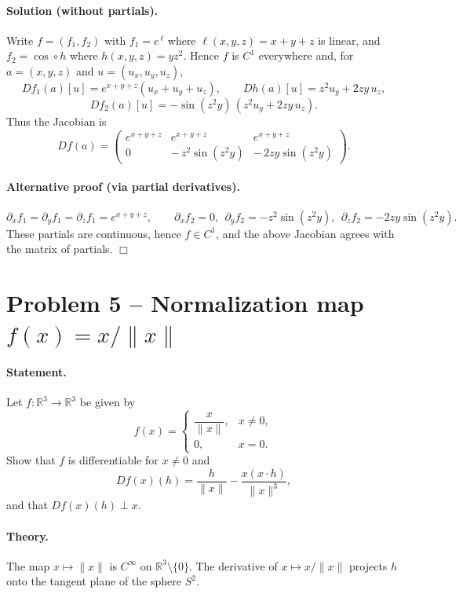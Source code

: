 \documentclass[12pt,a4paper]{article}
\theoremstyle{plain}
\theoremstyle{definition}
\theoremstyle{remark}
\theoremstyle{remark}
\begin{document}
\paragraph{Solution (without partials).}
Write $f=(f_1,f_2)$ with $f_1=e^{\,\ell}$ where $\ell(x,y,z)=x+y+z$ is linear, and
$f_2=\cos\circ h$ where $h(x,y,z)=yz^2$.
Hence $f$ is $C^1$ everywhere and, for $a=(x,y,z)$ and $u=(u_x,u_y,u_z)$,
\[
Df_1(a)[u]=e^{x+y+z}(u_x+u_y+u_z),\qquad
Dh(a)[u]=z^2u_y+2zy\,u_z,
\]
\[
Df_2(a)[u]=-\sin(z^2y)\,(z^2u_y+2zy\,u_z).
\]
Thus the Jacobian is
\[
Df(a)=
\begin{pmatrix}
	e^{x+y+z} & e^{x+y+z} & e^{x+y+z}\\[3pt]
	0 & -\,z^2\sin(z^2y) & -\,2zy\sin(z^2y)
\end{pmatrix}.
\]

\paragraph{Alternative proof (via partial derivatives).}
\[
\partial_x f_1=\partial_y f_1=\partial_z f_1=e^{x+y+z},\qquad
\partial_x f_2=0,\ \ \partial_y f_2=-z^2\sin(z^2y),\ \ \partial_z f_2=-2zy\sin(z^2y).
\]
These partials are continuous, hence $f\in C^1$, and the above Jacobian agrees with the matrix of partials.
\hfill$\Box$

\section*{Problem 5 -- Normalization map $f(x)=x/\|x\|$}

\paragraph{Statement.}
Let $f:\mathbb{R}^3\to\mathbb{R}^3$ be given by
\[
f(x)=
\begin{cases}
	\dfrac{x}{\|x\|}, & x\ne0,\\[4pt]
	0,&x=0.
\end{cases}
\]
Show that $f$ is differentiable for $x\ne0$ and
\[
Df(x)(h)=\frac{h}{\|x\|}-\frac{x(x\cdot h)}{\|x\|^3},
\]
and that $Df(x)(h)\perp x$.

\paragraph{Theory.}
The map $x\mapsto\|x\|$ is $C^\infty$ on $\mathbb{R}^3\setminus\{0\}$.
The derivative of $x\mapsto x/\|x\|$ projects $h$ onto the tangent plane of the sphere $S^2$.
\end{document}
